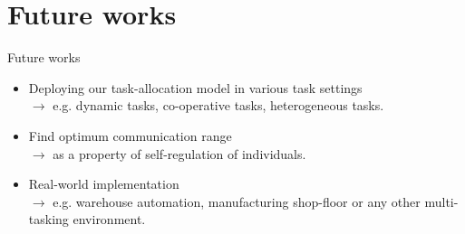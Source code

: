 \documentclass{beamer}
\begin{document}
\section{Future works}
\begin{frame}[t]{Future works}
  \begin{itemize}
    \item \normalsize \alert{Deploying our task-allocation model in various task settings}\\
    $\rightarrow$ \small e.g. dynamic tasks, co-operative tasks, heterogeneous tasks.
    \item \normalsize \alert{Find optimum communication range}\\
    $\rightarrow$ \small as a property of self-regulation of individuals.
    \item \normalsize \alert{Real-world implementation}\\
    $\rightarrow$ \small e.g. warehouse automation, manufacturing shop-floor or any other multi-tasking environment.
    \end{itemize}
\end{frame}
\end{document}
